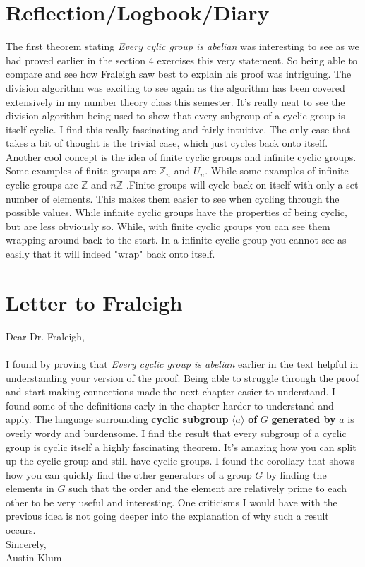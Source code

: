 \documentclass[11pt]{article}
\theoremstyle{plain}
\theoremstyle{definition}
\newcommand{\Z}{\mathbb{Z}}
\begin{document}
\section{Reflection/Logbook/Diary}
The first theorem stating \textit{Every cylic group is abelian} was interesting to see as we had proved earlier in the section 4 exercises this very statement. So being able to compare and see how Fraleigh saw best to explain his proof was intriguing. The division algorithm was exciting to see again as the algorithm has been covered extensively in my number theory class this semester. It's really neat to see the division algorithm being used to show that every subgroup of a cyclic group is itself cyclic. I find this really fascinating and fairly intuitive. The only case that takes a bit of thought is the trivial case, which just cycles back onto itself. Another cool concept is the idea of finite cyclic groups and infinite cyclic groups. Some examples of finite groups are $ \Z_n $ and $ U_n $. While some examples of infinite cyclic groups are $ \Z $ and $ n\Z $ .Finite groups will cycle back on itself with only a set number of elements. This makes them easier to see when cycling through the possible values. While infinite cyclic groups have the properties of being cyclic, but are less obviously so. While, with finite cyclic groups you can see them wrapping around back to the start. In a infinite cyclic group you cannot see as easily that it will indeed "wrap" back onto itself.

\section{Letter to Fraleigh}
Dear Dr. Fraleigh,\\
\\
I found by proving that \textit{Every cyclic group is abelian} earlier in the text helpful in understanding your version of the proof. Being able to struggle through the proof and start making connections made the next chapter easier to understand. I found some of the definitions early in the chapter harder to understand and apply. The language surrounding \textbf{cyclic subgroup} $ \langle a \rangle $ \textbf{of} $ G $ \textbf{generated by} $ a $ is overly wordy and burdensome. I find the result that every subgroup of a cyclic group is cyclic itself a highly fascinating theorem. It's amazing how you can split up the cyclic group and still have cyclic groups. I found the corollary that shows how you can quickly find the other generators of a group $ G $ by finding the elements in $ G $ such that the order and the element are relatively prime to each other to be very useful and interesting. One criticisms I would have with the previous idea is not going deeper into the explanation of why such a result occurs.
\\
Sincerely,\\
Austin Klum
\end{document}
